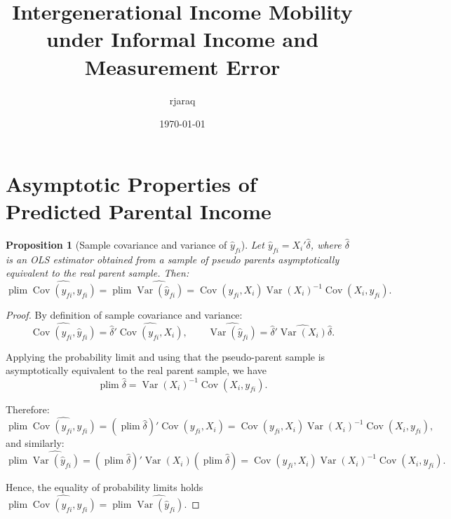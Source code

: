 \documentclass[12pt,oneside]{article}
\title{Intergenerational Income Mobility under Informal Income and Measurement Error}
\author{rjaraq}
\date{\today}
\DeclareMathOperator{\var}{Var}
\DeclareMathOperator{\cov}{Cov}
\DeclareMathOperator*{\plim}{plim}
\newtheorem{proposition}{Proposition}[section]
\theoremstyle{bracket}
\begin{document}
\maketitle

\printbibliography

\appendix
\renewcommand{\thesection}{\Alph{section}} %
\renewcommand{\thesubsection}{\Alph{section}.\arabic{subsection}}

\section{Asymptotic Properties of Predicted Parental Income}
\label{app:assumption}

\begin{proposition}[Sample covariance and variance of $\hat{y}_{fi}$]
\label{prop:covvar}
Let $\hat{y}_{fi} = X_i' \hat{\delta}$, where $\hat{\delta}$ is an OLS estimator obtained from a sample of pseudo parents asymptotically equivalent to the real parent sample. Then:
\[
\plim \widehat{\cov(y_{fi}, \hat{y}_{fi})} = \plim \widehat{\var(\hat{y}_{fi})} = \cov(y_{fi}, X_i) \var(X_i)^{-1} \cov(X_i, y_{fi}).
\]
\end{proposition}

\begin{proof}
By definition of sample covariance and variance:
\[
\widehat{\cov(y_{fi}, \hat{y}_{fi})} = \hat{\delta}' \widehat{\cov(y_{fi}, X_i)}, \qquad
\widehat{\var(\hat{y}_{fi})} = \hat{\delta}' \widehat{\var(X_i)} \hat{\delta}.
\]

Applying the probability limit and using that the pseudo-parent sample is asymptotically equivalent to the real parent sample, we have
\[
\plim \hat{\delta} = \var(X_i)^{-1} \cov(X_i, y_{fi}).
\]

Therefore:
\[
\plim \widehat{\cov(y_{fi}, \hat{y}_{fi})} = (\plim \hat{\delta})' \cov(y_{fi}, X_i) = \cov(y_{fi}, X_i) \var(X_i)^{-1} \cov(X_i, y_{fi}),
\]
and similarly:
\[
\plim \widehat{\var(\hat{y}_{fi})} = (\plim \hat{\delta})' \var(X_i) (\plim \hat{\delta}) = \cov(y_{fi}, X_i) \var(X_i)^{-1} \cov(X_i, y_{fi}).
\]

Hence, the equality of probability limits holds $\plim \widehat{\cov(y_{fi}, \hat{y}_{fi})} = \plim \widehat{\var(\hat{y}_{fi})}$. \end{proof}
\end{document}
